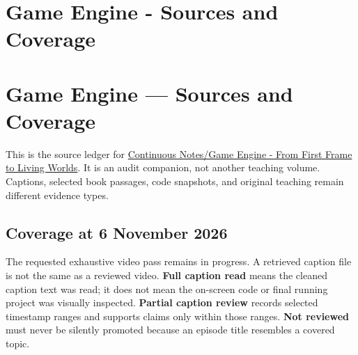 \hypertarget{appendix-877738f6f4d2}{}
\section*{Game Engine - Sources and Coverage}
\section{Game Engine --- Sources and Coverage}\label{game-engine-sources-and-coverage}

This is the source ledger for \href{Continuous\%20Notes/Game\%20Engine\%20-\%20From\%20First\%20Frame\%20to\%20Living\%20Worlds}{Continuous Notes/Game Engine - From First Frame to Living Worlds}. It is an audit companion, not another teaching volume. Captions, selected book passages, code snapshots, and original teaching remain different evidence types.

\subsection{Coverage at 6 November 2026}\label{coverage-at-6-november-2026}

The requested exhaustive video pass remains in progress. A retrieved caption file is not the same as a reviewed video. \textbf{Full caption read} means the cleaned caption text was read; it does not mean the on-screen code or final running project was visually inspected. \textbf{Partial caption review} records selected timestamp ranges and supports claims only within those ranges. \textbf{Not reviewed} must never be silently promoted because an episode title resembles a covered topic.


